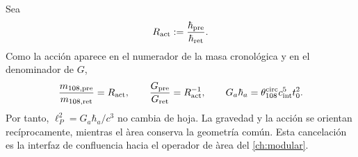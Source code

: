 Sea
\begin{equation}
\label{eq:gravity-Ract}
R_{\rm act}:=\frac{\hbar_{\rm pre}}{\hbar_{\rm ret}}.
\end{equation}
Como la acci\'on aparece en el numerador de la masa cronol\'ogica y en el
denominador de \(G\),
\begin{equation}
\label{eq:gravity-twoway-covariance}
\frac{m_{108,\rm pre}}{m_{108,\rm ret}}=R_{\rm act},
\qquad
\frac{G_{\rm pre}}{G_{\rm ret}}=R_{\rm act}^{-1},
\qquad
G_a\hbar_a
=\theta_{108}^{\rm circ}c_{\rm int}^5t_0^2.
\end{equation}
Por tanto, \(\ell_P^2=G_a\hbar_a/c^3\) no cambia de hoja. La gravedad y
la acci\'on se orientan rec\'iprocamente, mientras el \`area conserva la
geometr\'ia com\'un. Esta cancelaci\'on es la interfaz de confluencia hacia el operador de
\`area del \cref{ch:modular}.
